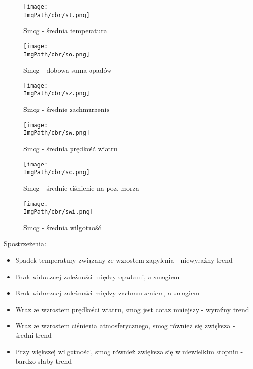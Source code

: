 \documentclass[a4paper,12pt,twoside,openany]{report}
\newcommand{\ImgPath}{.}
\begin{document}
\begin{figure}[H]
	\begin{center}
		\centering
		\texttt{[image: \\ImgPath/obr/st.png]}
	\end{center}
	\caption{Smog - średnia temperatura}
	\label{st}
\end{figure}

\begin{figure}[H]
	\begin{center}
		\centering
		\texttt{[image: \\ImgPath/obr/so.png]}
	\end{center}
	\caption{Smog - dobowa suma opadów}
	\label{so}
\end{figure}

\begin{figure}[H]
	\begin{center}
		\centering
		\texttt{[image: \\ImgPath/obr/sz.png]}
	\end{center}
	\caption{Smog - średnie zachmurzenie}
	\label{sz}
\end{figure}

\begin{figure}[H]
	\begin{center}
		\centering
		\texttt{[image: \\ImgPath/obr/sw.png]}
	\end{center}
	\caption{Smog - średnia prędkość wiatru}
	\label{sw}
\end{figure}

\begin{figure}[H]
	\begin{center}
		\centering
		\texttt{[image: \\ImgPath/obr/sc.png]}
	\end{center}
	\caption{Smog - średnie ciśnienie na poz. morza}
	\label{sc}
\end{figure}

\begin{figure}[H]
	\begin{center}
		\centering
		\texttt{[image: \\ImgPath/obr/swi.png]}
	\end{center}
	\caption{Smog - średnia wilgotność}
	\label{swi}
\end{figure}


Spostrzeżenia:

\begin{itemize}
	\item Spadek temperatury związany ze wzrostem zapylenia - niewyraźny trend
	\item Brak widocznej zależności między opadami, a smogiem
	\item Brak widocznej zależności między zachmurzeniem, a smogiem
	\item Wraz ze wzrostem prędkości wiatru, smog jest coraz mniejszy - wyraźny trend
	\item Wraz ze wzrostem ciśnienia atmosferycznego, smog również się zwiększa - średni trend
	\item Przy większej wilgotności, smog również zwiększa się w niewielkim stopniu - bardzo słaby trend
\end{itemize}
\end{document}
